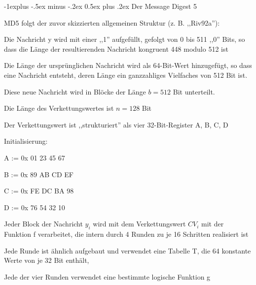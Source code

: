 \documentclass[a4paper]{article}
\makeatletter
\renewcommand{\subsection}{\@startsection{subsection}{2}{0mm}%
 {-1explus -.5ex minus -.2ex}%
 {0.5ex plus .2ex}%
 {\normalfont\normalsize\bfseries}}
\makeatother
\begin{document}
\begin{multicols}{3}
      \subsection{Der Message Digest 5}
      \begin{itemize*}
            \item MD5 folgt der zuvor skizzierten allgemeinen Struktur (z. B. ,,Riv92a''):
            \begin{itemize*}
                  \item Die Nachricht y wird mit einer ,,1'' aufgefüllt, gefolgt von 0 bis 511 ,,0'' Bits, so dass die Länge der resultierenden Nachricht kongruent 448 modulo 512 ist
                  \item Die Länge der ursprünglichen Nachricht wird als 64-Bit-Wert hinzugefügt, so dass eine Nachricht entsteht, deren Länge ein ganzzahliges Vielfaches von 512 Bit ist.
                  \item Diese neue Nachricht wird in Blöcke der Länge $b=512$ Bit unterteilt.
                  \item Die Länge des Verkettungswertes ist $n=128$ Bit
                  \begin{itemize*}
                        \item Der Verkettungswert ist ,,strukturiert'' als vier 32-Bit-Register A, B, C, D
                        \item Initialisierung:
                        \begin{itemize*}
                              \item A := 0x 01 23 45 67
                              \item B := 0x 89 AB CD EF
                              \item C := 0x FE DC BA 98
                              \item D := 0x 76 54 32 10
                        \end{itemize*}
                  \end{itemize*}
                  \item Jeder Block der Nachricht $y_i$ wird mit dem Verkettungswert $CV_i$ mit der Funktion f verarbeitet, die intern durch 4 Runden zu je 16 Schritten realisiert ist
                  \begin{itemize*}
                        \item Jede Runde ist ähnlich aufgebaut und verwendet eine Tabelle T, die 64 konstante Werte von je 32 Bit enthält,
                        \item Jede der vier Runden verwendet eine bestimmte logische Funktion g

\end{itemize*}
\end{itemize*}
\end{itemize*}
\end{multicols}
\end{document}
